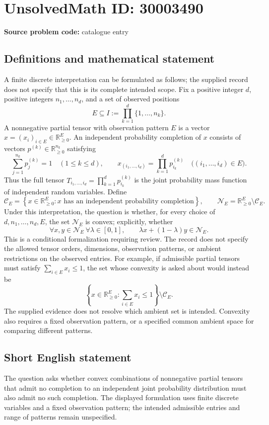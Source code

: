 \documentclass[11pt]{article}
\newcommand{\R}{\mathbb{R}}
\begin{document}
\section*{UnsolvedMath ID: 30003490}
\textbf{Source problem code:} catalogue entry
\subsection{Definitions and mathematical statement}
A finite discrete interpretation can be formulated as follows; the supplied record does not specify that this is its complete intended scope. Fix a positive integer \(d\), positive integers \(n_1,\ldots,n_d\), and a set of observed positions
\[
E\subseteq I:=\prod_{k=1}^{d}\{1,\ldots,n_k\}.
\]
A nonnegative partial tensor with observation pattern \(E\) is a vector \(x=(x_i)_{i\in E}\in\R_{\geq0}^{E}\). An independent probability completion of \(x\) consists of vectors \(p^{(k)}\in\R_{\geq0}^{n_k}\) satisfying
\[
\sum_{j=1}^{n_k}p^{(k)}_j=1\quad(1\leq k\leq d),
\qquad
x_{(i_1,\ldots,i_d)}=\prod_{k=1}^{d}p^{(k)}_{i_k}
\quad\bigl((i_1,\ldots,i_d)\in E\bigr).
\]
Thus the full tensor \(T_{i_1,\ldots,i_d}=\prod_{k=1}^{d}p^{(k)}_{i_k}\) is the joint probability mass function of independent random variables. Define
\[
\mathcal C_E=\left\{x\in\R_{\geq0}^{E}:x\text{ has an independent probability completion}\right\},
\qquad
\mathcal N_E=\R_{\geq0}^{E}\setminus\mathcal C_E.
\]
Under this interpretation, the question is whether, for every choice of \(d,n_1,\ldots,n_d,E\), the set \(\mathcal N_E\) is convex; explicitly, whether
\[
\forall x,y\in\mathcal N_E\ \forall\lambda\in[0,1],
\qquad \lambda x+(1-\lambda)y\in\mathcal N_E.
\]
This is a conditional formalization requiring review. The record does not specify the allowed tensor orders, dimensions, observation patterns, or ambient restrictions on the observed entries. For example, if admissible partial tensors must satisfy \(\sum_{i\in E}x_i\leq1\), the set whose convexity is asked about would instead be
\[
\left\{x\in\R_{\geq0}^{E}:\sum_{i\in E}x_i\leq1\right\}\setminus\mathcal C_E.
\]
The supplied evidence does not resolve which ambient set is intended. Convexity also requires a fixed observation pattern, or a specified common ambient space for comparing different patterns.
\subsection{Short English statement}
The question asks whether convex combinations of nonnegative partial tensors that admit no completion to an independent joint probability distribution must also admit no such completion. The displayed formulation uses finite discrete variables and a fixed observation pattern; the intended admissible entries and range of patterns remain unspecified.
\end{document}
